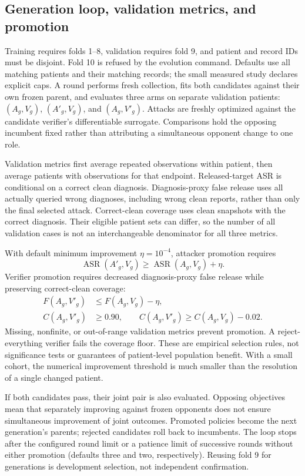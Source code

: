 \subsection{Generation loop, validation metrics, and promotion}
Training requires folds 1--8, validation requires fold 9, and patient and record IDs must be disjoint. Fold 10 is refused by the evolution command. Defaults use all matching patients and their matching records; the small measured study declares explicit caps. A round performs fresh collection, fits both candidates against their own frozen parent, and evaluates three arms on separate validation patients: $(A_g,V_g)$, $(A'_g,V_g)$, and $(A_g,V'_g)$. Attacks are freshly optimized against the candidate verifier's differentiable surrogate. Comparisons hold the opposing incumbent fixed rather than attributing a simultaneous opponent change to one role.

Validation metrics first average repeated observations within patient, then average patients with observations for that endpoint. Released-target ASR is conditional on a correct clean diagnosis. Diagnosis-proxy false release uses all actually queried wrong diagnoses, including wrong clean reports, rather than only the final selected attack. Correct-clean coverage uses clean snapshots with the correct diagnosis. Their eligible patient sets can differ, so the number of all validation cases is not an interchangeable denominator for all three metrics.

With default minimum improvement $\eta=10^{-4}$, attacker promotion requires
\begin{equation}
 \operatorname{ASR}(A'_g,V_g)\geq\operatorname{ASR}(A_g,V_g)+\eta.
\end{equation}
Verifier promotion requires decreased diagnosis-proxy false release while preserving correct-clean coverage:
\begin{align}
 F(A_g,V'_g)&\leq F(A_g,V_g)-\eta,\\
 C(A_g,V'_g)&\geq0.90,\qquad
 C(A_g,V'_g)\geq C(A_g,V_g)-0.02.
\end{align}
Missing, nonfinite, or out-of-range validation metrics prevent promotion. A reject-everything verifier fails the coverage floor. These are empirical selection rules, not significance tests or guarantees of patient-level population benefit. With a small cohort, the numerical improvement threshold is much smaller than the resolution of a single changed patient.

If both candidates pass, their joint pair is also evaluated. Opposing objectives mean that separately improving against frozen opponents does not ensure simultaneous improvement of joint outcomes. Promoted policies become the next generation's parents; rejected candidates roll back to incumbents. The loop stops after the configured round limit or a patience limit of successive rounds without either promotion (defaults three and two, respectively). Reusing fold 9 for generations is development selection, not independent confirmation.

